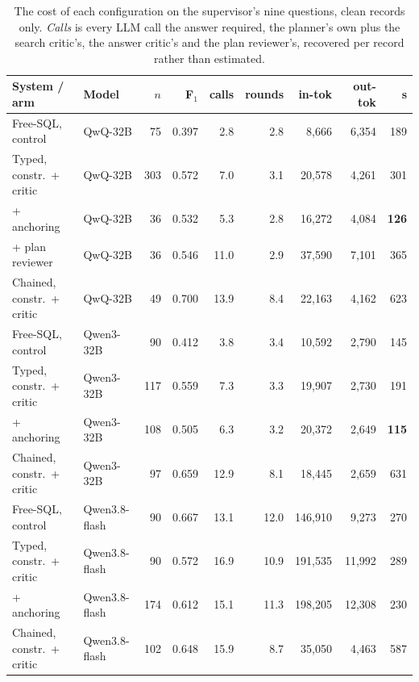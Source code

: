 \begin{table}[htbp]
\centering
\small
\setlength{\tabcolsep}{5pt}
\begin{tabular}{llrrrrrrr}
\toprule
System / arm & Model & $n$ & F$_1$ & calls & rounds & in-tok & out-tok & s \\
\midrule
Free-SQL, control            & QwQ-32B &  75 & 0.397 &  2.8 & 2.8 &  8{,}666 & 6{,}354 & 189 \\
Typed, constr.\ + critic     & QwQ-32B & 303 & 0.572 &  7.0 & 3.1 & 20{,}578 & 4{,}261 & 301 \\
\quad + anchoring            & QwQ-32B &  36 & 0.532 &  5.3 & 2.8 & 16{,}272 & 4{,}084 & \textbf{126} \\
\quad + plan reviewer        & QwQ-32B &  36 & 0.546 & 11.0 & 2.9 & 37{,}590 & 7{,}101 & 365 \\
Chained, constr.\ + critic   & QwQ-32B &  49 & 0.700 & 13.9 & 8.4 & 22{,}163 & 4{,}162 & 623 \\
\midrule
Free-SQL, control            & Qwen3-32B &  90 & 0.412 &  3.8 & 3.4 & 10{,}592 & 2{,}790 & 145 \\
Typed, constr.\ + critic     & Qwen3-32B & 117 & 0.559 &  7.3 & 3.3 & 19{,}907 & 2{,}730 & 191 \\
\quad + anchoring            & Qwen3-32B & 108 & 0.505 &  6.3 & 3.2 & 20{,}372 & 2{,}649 & \textbf{115} \\
Chained, constr.\ + critic   & Qwen3-32B &  97 & 0.659 & 12.9 & 8.1 & 18{,}445 & 2{,}659 & 631 \\
\midrule
Free-SQL, control            & Qwen3.8-flash &  90 & 0.667 & 13.1 & 12.0 & 146{,}910 &  9{,}273 & 270 \\
Typed, constr.\ + critic     & Qwen3.8-flash &  90 & 0.572 & 16.9 & 10.9 & 191{,}535 & 11{,}992 & 289 \\
\quad + anchoring            & Qwen3.8-flash & 174 & 0.612 & 15.1 & 11.3 & 198{,}205 & 12{,}308 & 230 \\
Chained, constr.\ + critic   & Qwen3.8-flash & 102 & 0.648 & 15.9 &  8.7 &  35{,}050 &  4{,}463 & 587 \\
\bottomrule
\end{tabular}
\caption[What each configuration costs]{The cost of each configuration on the
supervisor's nine questions, clean records only. \emph{Calls} is every LLM call
the answer required, the planner's own plus the search critic's, the answer
critic's and the plan reviewer's, recovered per record rather than estimated.
}
\end{table}

